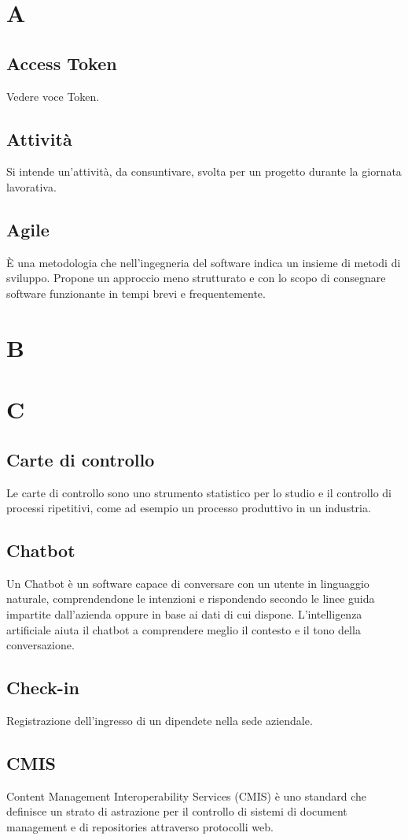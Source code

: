 \section{A}
\subsection{Access Token}
Vedere voce Token.
\subsection{Attività}
Si intende un'attività, da consuntivare, svolta per un progetto durante la giornata lavorativa.
\subsection{Agile}
È una metodologia che nell'ingegneria del software indica un insieme di metodi di sviluppo. Propone un approccio meno strutturato e con lo scopo
di consegnare software funzionante in tempi brevi e frequentemente.
\newpage
\section{B}
\section{C}
\subsection{Carte di controllo}
Le carte di controllo sono uno strumento statistico per lo studio e il controllo di processi ripetitivi, come ad esempio un processo produttivo in un industria.
\subsection{Chatbot}
Un Chatbot è un software capace di conversare con un utente in linguaggio naturale, comprendendone 
le intenzioni e rispondendo secondo le linee guida impartite dall'azienda oppure in 
base ai dati di cui dispone. L'intelligenza artificiale aiuta il chatbot a comprendere meglio il 
contesto e il tono della conversazione.
\subsection{Check-in}
Registrazione dell'ingresso di un dipendete nella sede aziendale.
\subsection{CMIS}
Content Management Interoperability Services (CMIS) è uno standard che definisce un strato di astrazione per il controllo di
sistemi di document management e di repositories attraverso protocolli web.
